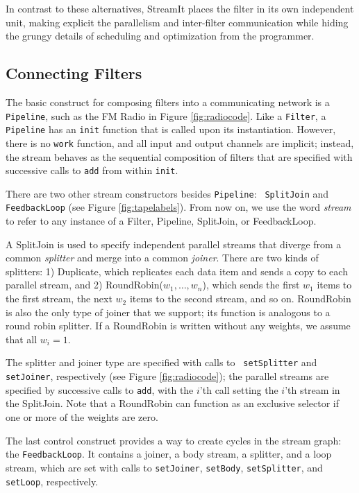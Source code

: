 In contrast to these alternatives, StreamIt places the filter in its
own independent unit, making explicit the parallelism and inter-filter
communication while hiding the grungy details of scheduling and
optimization from the programmer.

\subsection{Connecting Filters}
\label{sec:connecting}

The basic construct for composing filters into a communicating network
is a {\tt Pipeline}, such as the FM Radio in Figure
\ref{fig:radiocode}.  Like a {\tt Filter}, a {\tt Pipeline} has an
{\tt init} function that is called upon its instantiation.  However,
there is no {\tt work} function, and all input and output channels are
implicit; instead, the stream behaves as the sequential composition of
filters that are specified with successive calls to {\tt add} from
within {\tt init}.

There are two other stream constructors besides {\tt Pipeline}: {\tt
SplitJoin} and {\tt FeedbackLoop} (see Figure \ref{fig:tapelabels}).
From now on, we use the word {\it stream} to refer to any instance of
a Filter, Pipeline, SplitJoin, or FeedbackLoop.  

A SplitJoin is used to specify independent parallel streams that
diverge from a common {\it splitter} and merge into a common {\it
joiner}.  There are two kinds of splitters: 1) Duplicate, which
replicates each data item and sends a copy to each parallel stream,
and 2) RoundRobin($w_1, \dots, w_n$), which sends the first $w_1$
items to the first stream, the next $w_2$ items to the second stream,
and so on.  RoundRobin is also the only type of joiner that we
support; its function is analogous to a round robin splitter.  If a
RoundRobin is written without any weights, we assume that all $w_i =
1$.

The splitter and joiner type are specified with calls to {\tt
setSplitter} and {\tt setJoiner}, respectively (see Figure
\ref{fig:radiocode}); the parallel streams are specified by successive calls
to {\tt add}, with the $i$'th call setting the $i$'th stream in the
SplitJoin.  Note that a RoundRobin can function as an exclusive
selector if one or more of the weights are zero.

The last control construct provides a way to create cycles in the
stream graph: the {\tt FeedbackLoop}.  It contains a joiner, a body
stream, a splitter, and a loop stream, which are set with calls to
{\tt setJoiner}, {\tt setBody}, {\tt setSplitter}, and {\tt setLoop},
respectively.

